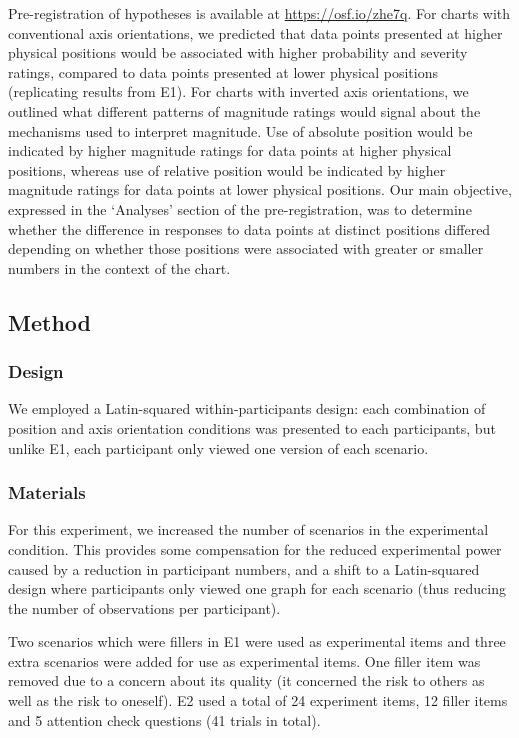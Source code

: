 \documentclass[journal]{vgtc}                %
\begin{document}
Pre-registration of hypotheses is available at \url{https://osf.io/zhe7q}. For charts with conventional axis orientations, we predicted that data points presented at higher physical positions would be associated with higher probability and severity ratings, compared to data points presented at lower physical positions (replicating results from E1). For charts with inverted axis orientations, we outlined what different patterns of magnitude ratings would signal about the mechanisms used to interpret magnitude. Use of absolute position would be indicated by higher magnitude ratings for data points at higher physical positions, whereas use of relative position would be indicated by higher magnitude ratings for data points at lower physical positions. Our main objective, expressed in the `Analyses' section of the pre-registration, was to determine whether the difference in responses to data points at distinct positions differed depending on whether those positions were associated with greater or smaller numbers in the context of the chart.

\hypertarget{method}{%
\subsection{Method}\label{method}}

\hypertarget{design-1}{%
\subsubsection{Design}\label{design-1}}

We employed a Latin-squared within-participants design: each combination of position and axis orientation conditions was presented to each participants, but unlike E1, each participant only viewed one version of each scenario.

\hypertarget{materials-1}{%
\subsubsection{Materials}\label{materials-1}}

For this experiment, we increased the number of scenarios in the experimental condition. This provides some compensation for the reduced experimental power caused by a reduction in participant numbers, and a shift to a Latin-squared design where participants only viewed one graph for each scenario (thus reducing the number of observations per participant).

Two scenarios which were fillers in E1 were used as experimental items and three extra scenarios were added for use as experimental items. One filler item was removed due to a concern about its quality (it concerned the risk to others as well as the risk to oneself). E2 used a total of 24 experiment items, 12 filler items and 5 attention check questions (41 trials in total).
\end{document}
